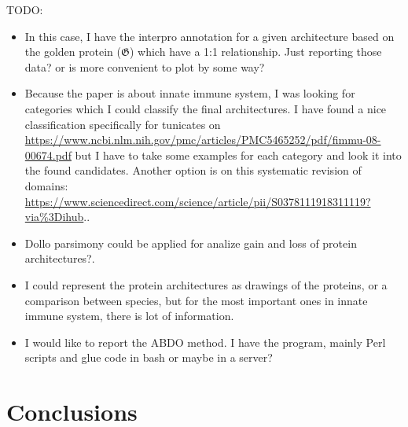 \documentclass[11pt]{article}
\newcommand{\TODO}[1]{\begingroup\color{red}#1\endgroup}
\begin{document}
\TODO{TODO:}
\begin{itemize}
\item \TODO{In this case, I have the interpro annotation for a given architecture based
on the golden protein ($\boldsymbol{\mathfrak{G}}$) which have a 1:1 relationship. Just
reporting those data? or is more convenient to plot by some way?}
\item \TODO{Because the paper is about innate immune system, I was looking for 
categories which I could classify the final architectures. I have found a nice classification
specifically for tunicates on \url{https://www.ncbi.nlm.nih.gov/pmc/articles/PMC5465252/pdf/fimmu-08-00674.pdf} but I have to take some examples for each category and look it into
the found candidates. Another option is on this systematic revision of domains: \url{https://www.sciencedirect.com/science/article/pii/S0378111918311119?via\%3Dihub}.}.
\item \TODO{Dollo parsimony could be applied for analize gain and loss of protein architectures?.}
\item \TODO{I could represent the protein architectures as drawings of the proteins, or a comparison between species, but for the most important ones in innate immune system, there is lot of information.}
\item \TODO{I would like to report the ABDO method. I have the program, mainly Perl scripts and glue code in bash or maybe in a server?}
\end{itemize}

\section*{Conclusions}



\end{document}
